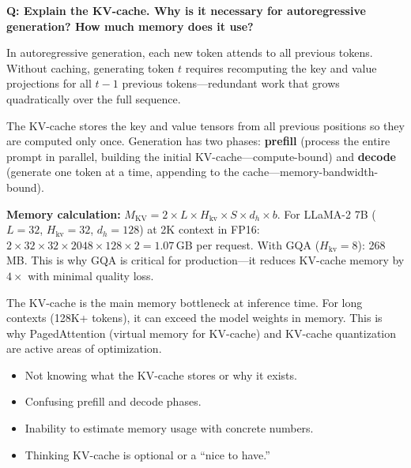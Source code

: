 \vspace{0.5em}

\begin{interviewq}
\textbf{Q: Explain the KV-cache.  Why is it necessary for autoregressive generation?
How much memory does it use?}

 \quad {} \quad \badgefreq{\freqhigh}

\stronganswer
In autoregressive generation, each new token attends to all previous tokens.  Without
caching, generating token $t$ requires recomputing the key and value projections for
all $t-1$ previous tokens---redundant work that grows quadratically over the full
sequence.

The KV-cache stores the key and value tensors from all previous positions so they are
computed only once.  Generation has two phases: \textbf{prefill} (process the entire
prompt in parallel, building the initial KV-cache---compute-bound) and \textbf{decode}
(generate one token at a time, appending to the cache---memory-bandwidth-bound).

\textbf{Memory calculation:}
$M_{\text{KV}} = 2 \times L \times H_{\text{kv}} \times S \times d_h \times b$.
For LLaMA-2 7B ($L{=}32$, $H_{\text{kv}}{=}32$, $d_h{=}128$) at 2K context in FP16:
$2 \times 32 \times 32 \times 2048 \times 128 \times 2 = 1.07$\,GB per request.  With
GQA ($H_{\text{kv}}{=}8$): 268\,MB.  This is why GQA is critical for production---it
reduces KV-cache memory by $4\times$ with minimal quality loss.

The KV-cache is the main memory bottleneck at inference time.  For long contexts (128K+
tokens), it can exceed the model weights in memory.  This is why PagedAttention (virtual
memory for KV-cache) and KV-cache quantization are active areas of optimization.

\redflags
\begin{itemize}
    \item Not knowing what the KV-cache stores or why it exists.
    \item Confusing prefill and decode phases.
    \item Inability to estimate memory usage with concrete numbers.
    \item Thinking KV-cache is optional or a ``nice to have.''
\end{itemize}



\end{interviewq}
